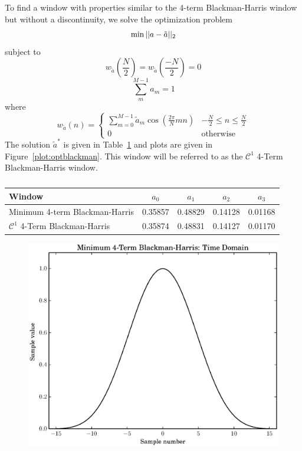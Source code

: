 \documentclass[letterpaper,12pt]{report}
\begin{document}
To find a window with properties similar to the 4-term Blackman-Harris window
but without a discontinuity, we solve the optimization problem
\[
        \min||a-\tilde{a}||_2 \\
\]
subject to
\[
        w_{\tilde{a}} \left( \frac{N}{2} \right)
            = w_{\tilde{a}} \left( \frac{-N}{2} \right) = 0
\]
\[
        \sum_{m}^{M-1} a_{m} = 1
\]
where
\[
    w_{\tilde{a}}(n) = \begin{cases}
        \sum_{m=0}^{M-1}\tilde{a}_{m}\cos \left( \frac{2\pi}{N}mn \right) & -\frac{N}{2} \leq n
        \leq \frac{N}{2} \\
        0 & \text{otherwise}
    \end{cases}
\]
The solution $\tilde{a}^{\ast}$ is given in Table~\ref{tab:optblackman} and
plots are given in Figure~\ref{plot:optblackman}. This window will be referred
to as the $\mathcal{C}^{1}$ 4-Term Blackman-Harris window.

\begin{table}
    \caption{\label{tab:optblackman}}
    \begin{center}
        \begin{tabular}{l c c c c }
            Window & $a_0$ & $a_1$ & $a_2$ & $a_3$ \\
            \hline
            Minimum 4-term Blackman-Harris & 0.35857 & 0.48829 & 0.14128 &
            0.01168 \\
            $\mathcal{C}^{1}$ 4-Term Blackman-Harris & 0.35874 & 0.48831 &
            0.14127 & 0.01170
        \end{tabular}
    \end{center}
\end{table}

\begin{figure}
    \caption{\label{plot:opt_blackman}}
    \includegraphics[width=\textwidth]{plots/min4_blackman_td.eps}
\end{figure}
\end{document}
